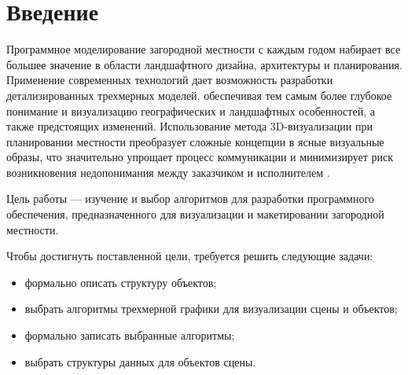 \chapter*{Введение}

Программное моделирование загородной местности с каждым годом набирает все большее значение в области ландшафтного дизайна, архитектуры и планирования. Применение современных технологий дает возможность разработки детализированных трехмерных моделей, обеспечивая тем самым более глубокое понимание и визуализацию географических и ландшафтных особенностей, а также предстоящих изменений. Использование метода 3D-визуализации при планировании местности преобразует сложные концепции в ясные визуальные образы, что значительно упрощает процесс коммуникации и минимизирует риск возникновения недопонимания между заказчиком и исполнителем \cite{intro_visualization}.
 
 
Цель работы --- изучение и выбор алгоритмов для разработки программного обеспечения, предназначенного для  визуализации и макетировании загородной местности. 


Чтобы достигнуть поставленной цели, требуется решить следующие задачи:
\begin{itemize}
    \item формально описать структуру объектов;
    \item выбрать алгоритмы трехмерной графики для визуализации сцены и объектов;
    \item  формально записать выбранные алгоритмы;
    \item  выбрать структуры данных для объектов сцены.
\end{itemize}

